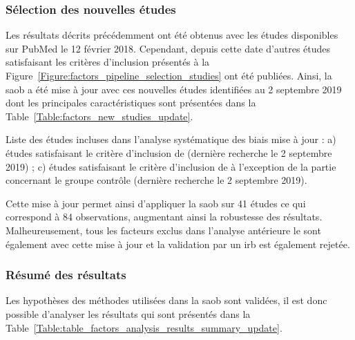 \subsubsection{Sélection des nouvelles études} 

Les résultats décrits précédemment ont été obtenus avec les études disponibles sur PubMed le 12 février 2018. Cependant, depuis cette date d'autres études satisfaisant
les critères d'inclusion présentés à la Figure~\ref{Figure:factors_pipeline_selection_studies} ont été publiées. Ainsi, la \gls{saob} a été mise à jour avec ces 
nouvelles études identifiées au 2 septembre 2019 dont les principales caractéristiques sont présentées dans la Table~\ref{Table:factors_new_studies_update}.

\begin{table}[h!]
  \centering
  \caption{Liste des études incluses dans l'analyse systématique des biais mise à jour : a) études satisfaisant le critère d'inclusion de \citet{Cortese2016} (dernière recherche 
	le 2 septembre 2019) ; c) études satisfaisant le critère d'inclusion de \citet{Cortese2016} à l'exception de la partie concernant le groupe contrôle 
	(dernière recherche le 2 septembre 2019).}
  
  \label{Table:factors_new_studies_update}
\end{table}

Cette mise à jour permet ainsi d'appliquer la \gls{saob} sur 41 études ce qui correspond à 84 observations, augmentant ainsi la robustesse des
résultats. Malheureusement, tous les facteurs exclus dans l'analyse antérieure le sont également avec cette mise à jour et la validation par
un \gls{irb} est également rejetée.

\subsubsection{Résumé des résultats} 

Les hypothèses des méthodes utilisées dans la \gls{saob} sont validées, il est donc possible d'analyser les résultats qui sont présentés dans la 
Table~\ref{Table:table_factors_analysis_results_summary_update}.

